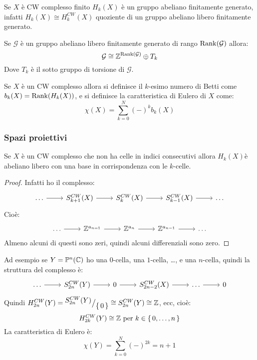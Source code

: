 \begin{corollary}
  Se $ X $ è CW complesso finito $ H_k(X) $ è un gruppo abeliano finitamente
  generato, infatti $ H_k(X) \cong H_k^{CW}(X) $ quoziente di un gruppo abeliano
  libero finitamente generato.
\end{corollary}

\begin{theorem}
  Se $ \mathcal{G} $ è un gruppo abeliano libero finitamente generato di rango
  $ \mathrm{Rank}( \mathcal{G} ) $ allora:
  \[
    \mathcal{G} \cong \mathbb{Z}^{\mathrm{Rank}( \mathcal{G} )} \oplus T_k
  \]
  Dove $ T_k $ è il sotto gruppo di torsione di $ \mathcal{G} $.
\end{theorem}

\begin{definition}
  Se $ X $ è un CW complesso allora si definisce il $ k $-esimo
  numero di Betti come $ b_k(X) = \mathrm{Rank}( H_k(X) ) $, e si definisce
  la caratteristica di Eulero di $ X $ come:
  \[
    \chi(X) = \sum_{k=0}^{N} (-)^k b_k(X)
  \]
\end{definition}

\subsubsection{Spazi proiettivi}

\begin{osservation}
  Se $ X $ è un CW complesso che non ha celle in indici consecutivi
  allora $ H_k(X) $è abeliano libero con una base in corrispondenza
  con le $ k $-celle.
\end{osservation}
\begin{proof}
  Infatti ho il complesso:
  \[
    \begin{tikzcd}
      \dots \rar & S^{CW}_{k+1}(X) \rar & S_k^{CW}(X) \rar & S_{k-1}^{CW}(X) \rar & \dots
    \end{tikzcd}
  \]
  Cioè:
  \[
    \begin{tikzcd}
      \dots \rar & \Z^{a_{n=1}} \rar & \Z^{a_n} \rar & \Z^{a_{n-1}} \rar & \dots
    \end{tikzcd}
  \]
  Almeno alcuni di questi sono zeri, quindi alcuni differenziali sono zero.
\end{proof}

Ad esempio se $ Y = \mathbb{P}^{n} (\mathbb{C}) $ ho una $ 0 $-cella, una $ 1 $-cella, \dots, e una
$ n $-cella, quindi la struttura del complesso è:
\[
  \begin{tikzcd}
    \dots \rar & S^{CW}_{2n}(Y) \rar & 0 \rar & S_{2n - 2}^{CW}(X) \rar & \dots \rar & 0
  \end{tikzcd}
\]
Quindi $ H_{2n}^{CW}(Y) = {^{\textstyle S^{CW}_{2n}(Y)}\big/_{\textstyle \set{0}}} \cong S_{2n}^{CW}(Y) \cong \mathbb{Z} $,
ecc, cioè:
\[
  H_{2k}^{CW}(Y) \cong \mathbb{Z} \text{ per } k \in \set{0, \dots, n}
\]
La caratteristica di Eulero è:
\[
  \chi(Y) = \sum_{k=0}^N (-)^{2k} = n + 1
\]

